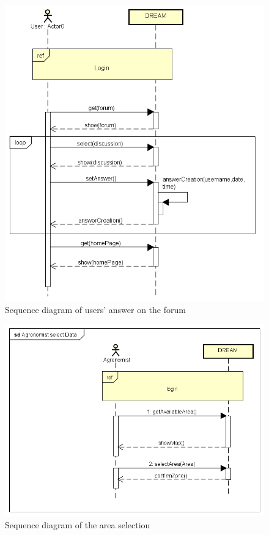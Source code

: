 \bigskip
\begin{figure}[H]
    \centering
    \includegraphics[scale=0.7]{Images/userAnswersForumDiscussion.png}
    \caption{Sequence diagram of users' answer on the forum}
\end{figure}

\bigskip
\begin{figure}[H]
    \centering
    \includegraphics[scale=0.7]{Images/AgronomistSelectDataSequence.png}
    \caption{Sequence diagram of the area selection}
\end{figure}

